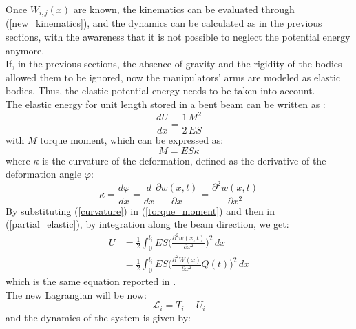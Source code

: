 \documentclass[a4paper,12pt,oneside]{report}
\begin{document}
Once $W_{i,j}(x)$ are known, the kinematics can be evaluated through (\ref{new_kinematics}), and the dynamics can be calculated as in the previous sections, with the awareness that it is not possible to neglect the potential energy anymore.\\
If, in the previous sections, the absence of gravity and the rigidity of the bodies allowed them to be ignored, now the manipulators' arms are modeled as elastic bodies. Thus, the elastic potential energy needs to be taken into account.\\
The elastic energy for unit length stored in a bent beam can be written as \cite{twentyone}:
\begin{equation}
  \frac{dU}{dx}=\frac{1}{2}\frac{M^2}{ES}
  \label{partial_elastic}
\end{equation}
with $M$ torque moment, which can be expressed as:
\begin{equation}
  M=ES\kappa
  \label{torque_moment}
\end{equation}
where $\kappa$ is the curvature of the deformation, defined as the derivative of the deformation angle $\varphi$:
\begin{equation}
  \kappa=\frac{d\varphi}{dx}=\frac{d}{dx}\frac{\partial w(x,t)}{\partial x}=\frac{\partial^2 w(x,t)}{\partial x^2}
  \label{curvature}
\end{equation}
By substituting (\ref{curvature}) in (\ref{torque_moment}) and then in (\ref{partial_elastic}), by integration along the beam direction, we get:
\begin{equation}
  \begin{split}
  U&=\frac{1}{2}\int_{0}^{l_i}ES\Big(\frac{\partial^2 w(x,t)}{\partial x^2}\Big)^2\,dx\\
   &=\frac{1}{2}\int_{0}^{l_i}ES\Big(\frac{\partial^2 W(x)}{\partial x^2}Q(t)\Big)^2\,dx
  \end{split}
\end{equation}
which is the same equation reported in \cite{seventeen,eighteen}.\\
The new Lagrangian will be now:
\begin{equation}
  \mathcal{L}_i = T_i-U_i
\end{equation}
and the dynamics of the system is given by:
\end{document}

